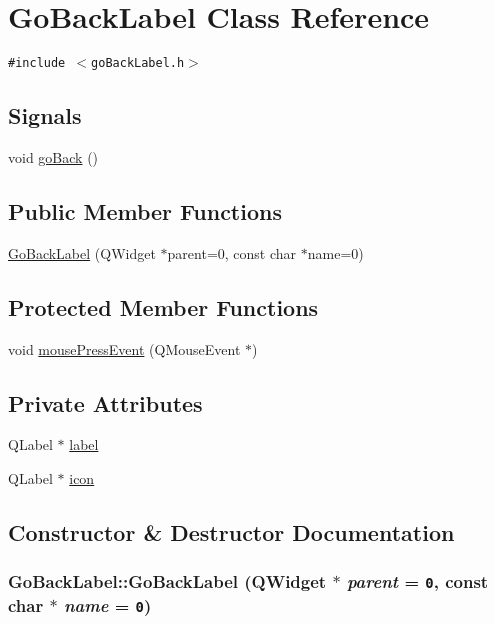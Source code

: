 \hypertarget{classGoBackLabel}{
\section{Go\-Back\-Label Class Reference}
\label{classGoBackLabel}
}
{\tt \#include $<$go\-Back\-Label.h$>$}

\subsection*{Signals}
\begin{CompactItemize}
\item 
void \hyperlink{classGoBackLabel_l0}{go\-Back} ()
\end{CompactItemize}
\subsection*{Public Member Functions}
\begin{CompactItemize}
\item 
\hyperlink{classGoBackLabel_a0}{Go\-Back\-Label} (QWidget $\ast$parent=0, const char $\ast$name=0)
\end{CompactItemize}
\subsection*{Protected Member Functions}
\begin{CompactItemize}
\item 
void \hyperlink{classGoBackLabel_b0}{mouse\-Press\-Event} (QMouse\-Event $\ast$)
\end{CompactItemize}
\subsection*{Private Attributes}
\begin{CompactItemize}
\item 
QLabel $\ast$ \hyperlink{classGoBackLabel_r0}{label}
\item 
QLabel $\ast$ \hyperlink{classGoBackLabel_r1}{icon}
\end{CompactItemize}


\subsection{Constructor \& Destructor Documentation}
\hypertarget{classGoBackLabel_a0}{
\subsubsection[GoBackLabel]{\setlength{\rightskip}{0pt plus 5cm}Go\-Back\-Label::Go\-Back\-Label (QWidget $\ast$ {\em parent} = {\tt 0}, const char $\ast$ {\em name} = {\tt 0})}}
\label{classGoBackLabel_a0}


